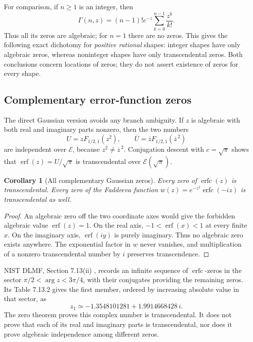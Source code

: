 \documentclass[11pt,a4paper]{article}
\newcommand{\E}{\mathcal E}
\newtheorem{corollary}[theorem]{Corollary}
\theoremstyle{definition}
\theoremstyle{remark}
\numberwithin{equation}{section}
\begin{document}
For comparison, if \(n\ge1\) is an integer, then
\[
 \Gamma(n,z)=(n-1)!e^{-z}\sum_{k=0}^{n-1}\frac{z^k}{k!}.
\]
Thus all its zeros are algebraic; for \(n=1\) there are no zeros. This
gives the following exact dichotomy for \emph{positive rational} shapes:
integer shapes have only algebraic zeros, whereas noninteger shapes have
only transcendental zeros. Both conclusions concern locations of zeros;
they do not assert existence of zeros for every shape.

\subsection{Complementary error-function zeros}

The direct Gaussian version avoids any branch ambiguity. If \(z\) is
algebraic with both real and imaginary parts nonzero, then the two numbers
\[
 U=zF_{1/2,1}(z^2),\qquad
 \overline U=\overline zF_{1/2,1}(\overline z^{\,2})
\]
are independent over \(\E\), because
\(z^2\ne\overline z^{\,2}\). Conjugation descent with
\(c=\sqrt\pi\) shows that \(\operatorname{erf}(z)=U/\sqrt\pi\) is
transcendental over \(\E(\sqrt\pi)\).

\begin{corollary}[All complementary Gaussian zeros]\label{norm:cor:erfc-zeros}
Every zero of \(\operatorname{erfc}(z)\) is transcendental. Every zero of
the Faddeeva function
\(w(z)=e^{-z^2}\operatorname{erfc}(-iz)\) is transcendental as well.
\end{corollary}
\begin{proof}
An algebraic zero off the two coordinate axes would give the forbidden
algebraic value \(\operatorname{erf}(z)=1\). On the real axis,
\(-1<\operatorname{erf}(x)<1\) at every finite \(x\). On the imaginary
axis, \(\operatorname{erf}(iy)\) is purely imaginary. Thus no algebraic
zero exists anywhere. The exponential factor in \(w\) never vanishes,
and multiplication of a nonzero transcendental number by \(i\) preserves
transcendence.
\end{proof}

NIST DLMF, Section 7.13(ii) \cite{DLMF}, records an infinite sequence of
\(\operatorname{erfc}\)-zeros in the sector
\(\pi/2<\arg z<3\pi/4\), with their conjugates providing the remaining
zeros. Its Table 7.13.2 gives the first member, ordered by increasing
absolute value in that sector, as
\[
 z_1\simeq -1.3548101281+1.9914668428\,i.
\]
The zero theorem proves this complex number is transcendental. It does
not prove that each of its real and imaginary parts is transcendental,
nor does it prove algebraic independence among different zeros.
\end{document}
